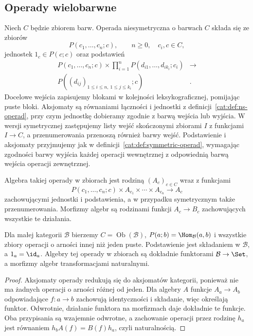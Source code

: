 \subsection{Operady wielobarwne}

\begin{definicja}\label{cat:def:colored-operad}
Niech $C$ będzie zbiorem barw. Operada niesymetryczna o barwach $C$ składa się ze zbiorów
\[
 P(c_1,\ldots,c_n;c),\qquad n\geq0,\quad c_i,c\in C,
\]
jednostek $1_c\in P(c;c)$ oraz podstawień
\[
\begin{aligned}
 P(c_1,\ldots,c_n;c)\times
 \prod_{i=1}^{n} P(d_{i1},\ldots,d_{ik_i};c_i)
 &\longrightarrow\\
 P((d_{ij})_{1\leq i\leq n,\ 1\leq j\leq k_i};c)&.
\end{aligned}
\]
Docelowe wejścia zapisujemy blokami w kolejności leksykograficznej, pomijając puste bloki. Aksjomaty są równaniami łączności i jednostki z definicji~\ref{cat:def:ns-operad}, przy czym jednostkę dobieramy zgodnie z barwą wejścia lub wyjścia. W wersji symetrycznej zastępujemy listy wejść skończonymi zbiorami $I$ z funkcjami $I\to C$, a przenumerowania przenoszą również barwy wejść. Podstawienie i aksjomaty przyjmujemy jak w definicji~\ref{cat:def:symmetric-operad}, wymagając zgodności barwy wyjścia każdej operacji wewnętrznej z odpowiednią barwą wejścia operacji zewnętrznej.
\end{definicja}
Algebra takiej operady w zbiorach jest rodziną $(A_c)_{c\in C}$ wraz z funkcjami
\[
 P(c_1,\ldots,c_n;c)\times A_{c_1}\times\cdots\times A_{c_n}
 \longrightarrow A_c
\]
zachowującymi jednostki i podstawienia, a w przypadku symetrycznym także przenumerowania. Morfizmy algebr są rodzinami funkcji $A_c\to B_c$ zachowujących wszystkie te działania.

\begin{przyklad}\label{cat:ex:category-colored-operad}
Dla małej kategorii $\mathcal B$ bierzemy $C=\operatorname{Ob}(\mathcal B)$, $P(a;b)=\Hom_{\mathcal B}(a,b)$ i wszystkie zbiory operacji o arności innej niż jeden puste. Podstawienie jest składaniem w $\mathcal B$, a $1_a=\id_a$. Algebry tej operady w zbiorach są dokładnie funktorami $\mathcal B\to\Set$, a morfizmy algebr transformacjami naturalnymi.
\end{przyklad}
\begin{proof}
Aksjomaty operady redukują się do aksjomatów kategorii, ponieważ nie ma żadnych operacji o arności różnej od jeden. Dla algebry $A$ funkcje $A_a\to A_b$ odpowiadające $f:a\to b$ zachowują identyczności i składanie, więc określają funktor. Odwrotnie, działanie funktora na morfizmach daje dokładnie te funkcje. Oba przypisania są wzajemnie odwrotne, a zachowanie operacji przez rodzinę $h_a$ jest równaniem $h_b A(f)=B(f)h_a$, czyli naturalnością.
\end{proof}

